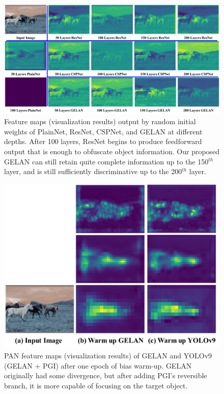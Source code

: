 \documentclass[10pt,twocolumn,letterpaper]{article}
\begin{document}
	\begin{figure}[t]
		\begin{center}
			\includegraphics[width=1.\linewidth]{figs/deep}
		\end{center}
		\vspace{-14pt}
		\caption{Feature maps (visualization results) output by random initial weights of PlainNet, ResNet, CSPNet, and GELAN at different depths.  After 100 layers, ResNet begins to produce feedforward output that is enough to obfuscate object information.  Our proposed GELAN can still retain quite complete information up to the 150$^{th}$ layer, and is still sufficiently discriminative up to the 200$^{th}$ layer.}	
		\label{fig:deep}
		\vspace{-16pt}
	\end{figure}

	\begin{figure}[t]
		\begin{center}
			\includegraphics[width=1.\linewidth]{figs/warm}
		\end{center}
		\vspace{-12pt}
		\caption{PAN feature maps (visualization results) of GELAN and YOLOv9 (GELAN + PGI) after one epoch of bias warm-up.  GELAN originally had some divergence, but after adding PGI's reversible branch, it is more capable of focusing on the target object.}	
		\label{fig:warm}
		\vspace{-20pt}
	\end{figure}
	
\end{document}
